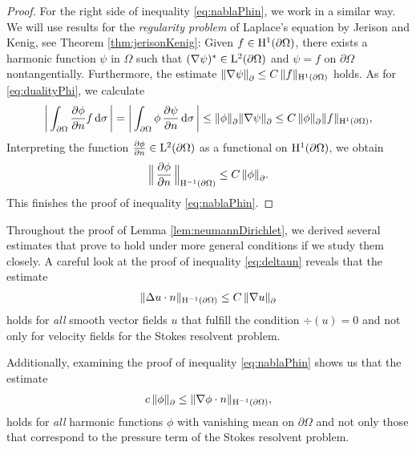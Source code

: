 \begin{proof}
  For the right side of inequality \eqref{eq:nablaPhin}, we work in a similar way.
  We will use results for the \emph{regularity problem} of Laplace's equation by Jerison and Kenig, see Theorem \ref{thm:jerisonKenig}:
  Given $f \in \mathrm{H}^1(\partial\Omega)$, there exists a harmonic function $\psi$ in $\Omega$ such that $(\nabla\psi)^* \in \mathrm{L}^2(\partial\Omega)$ and $\psi = f$ on $\partial\Omega$ nontangentially. Furthermore, the estimate $\|\nabla \psi\|^{}_\partial \leq C\, \|f\|_{\mathrm{H}^1(\partial\Omega)}$ holds.
  As for \eqref{eq:dualityPhi}, we calculate
  \begin{align*}
    \bigg| \int_{\partial\Omega} \frac{\partial\phi}{\partial n} f \, {\operatorname{d}\!{\sigma}}\, \bigg|
    = \bigg| \int_{\partial\Omega} \phi\, \frac{\partial \psi}{\partial n} \, {\operatorname{d}\!{\sigma}}\, \bigg| 
    \leq \|\phi\|^{}_{\partial} \|\nabla \psi \|^{}_\partial 
    \leq C\, \|\phi\|^{}_\partial \|f\|_{\mathrm{H}^1(\partial\Omega)},
  \end{align*}
  Interpreting the function $\frac{\partial\phi}{\partial n} \in \mathrm{L}^2(\partial\Omega)$ as a functional on $\mathrm{H}^1(\partial\Omega)$, we obtain
  \begin{align*}
      \Big\|\,\frac{\partial\phi}{\partial n}\, \Big\|_{\mathrm{H}^{-1}(\partial\Omega)} \leq C\, \|\phi\|^{}_\partial. 
  \end{align*}
  This finishes the proof of inequality \eqref{eq:nablaPhin}.
\end{proof}

\begin{rem}
  \label{rem:harmonicEstimate}
  Throughout the proof of Lemma \ref{lem:neumannDirichlet}, we derived several estimates that prove to hold under more general conditions if we study them closely.
  A careful look at the proof of inequality \eqref{eq:deltaun} reveals that the estimate
  \begin{align*}
    \|\Delta u \cdot n\|_{\mathrm{H}^{-1}(\partial\Omega)}
    \leq C\, \|\nabla u\|^{}_\partial
  \end{align*}
  holds for \emph{all} smooth vector fields $u$ that fulfill the condition $\div(u) = 0$ and not only for velocity fields for the Stokes resolvent problem.

  Additionally, examining the proof of inequality \eqref{eq:nablaPhin} shows us that the estimate
  \begin{align*}
      c\, \| \phi \|^{}_\partial \leq \| \nabla \phi \cdot n \|_{\mathrm{H}^{-1}(\partial\Omega)},
  \end{align*}
  holds for \emph{all} harmonic functions $\phi$ with vanishing mean on $\partial\Omega$ and not only those that correspond to the pressure term of the Stokes resolvent problem.
\end{rem}

